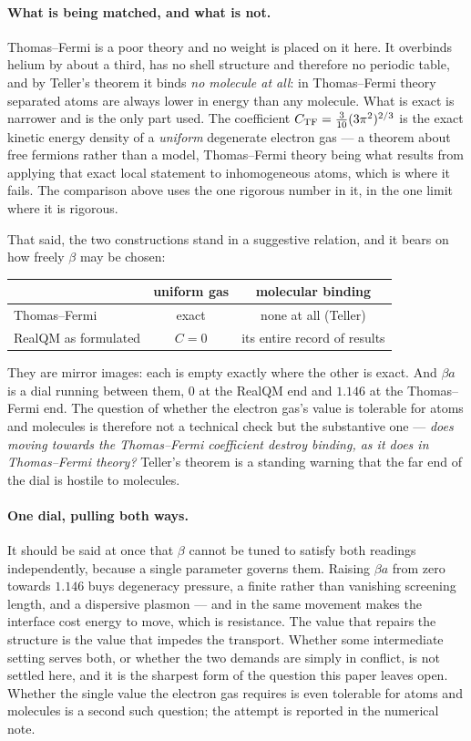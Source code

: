 \documentclass[11pt]{article}
\begin{document}
\paragraph{What is being matched, and what is not.} Thomas--Fermi is a poor theory and no weight is
placed on it here. It overbinds helium by about a third, has no shell structure and therefore no
periodic table, and by Teller's theorem it binds \emph{no molecule at all}: in Thomas--Fermi theory
separated atoms are always lower in energy than any molecule. What is exact is narrower and is the
only part used. The coefficient $C_{\rm TF}=\tfrac{3}{10}(3\pi^2)^{2/3}$ is the exact kinetic energy
density of a \emph{uniform} degenerate electron gas --- a theorem about free fermions rather than a
model, Thomas--Fermi theory being what results from applying that exact local statement to
inhomogeneous atoms, which is where it fails. The comparison above uses the one rigorous number in
it, in the one limit where it is rigorous.

That said, the two constructions stand in a suggestive relation, and it bears on how freely $\beta$
may be chosen:

\begin{center}
\small
\begin{tabular}{@{}lcc@{}}
\toprule
 & uniform gas & molecular binding\\
\midrule
Thomas--Fermi & exact & none at all (Teller)\\
RealQM as formulated & $C=0$ & its entire record of results\\
\bottomrule
\end{tabular}
\end{center}

\noindent They are mirror images: each is empty exactly where the other is exact. And $\beta a$ is a
dial running between them, $0$ at the RealQM end and $1.146$ at the Thomas--Fermi end. The question
of whether the electron gas's value is tolerable for atoms and molecules is therefore not a technical
check but the substantive one --- \emph{does moving towards the Thomas--Fermi coefficient destroy
binding, as it does in Thomas--Fermi theory?} Teller's theorem is a standing warning that the far end
of the dial is hostile to molecules.

\paragraph{One dial, pulling both ways.} It should be said at once that $\beta$ cannot be tuned to
satisfy both readings independently, because a single parameter governs them. Raising $\beta a$ from
zero towards $1.146$ buys degeneracy pressure, a finite rather than vanishing screening length, and a
dispersive plasmon ---
and in the same movement makes the interface cost energy to move, which is resistance. The value
that repairs the structure is the value that impedes the transport. Whether some intermediate setting
serves both, or whether the two demands are simply in conflict, is not settled here, and it is the
sharpest form of the question this paper leaves open. Whether the single value the electron gas
requires is even tolerable for atoms and molecules is a second such question; the attempt is reported
in the numerical note.
\end{document}
